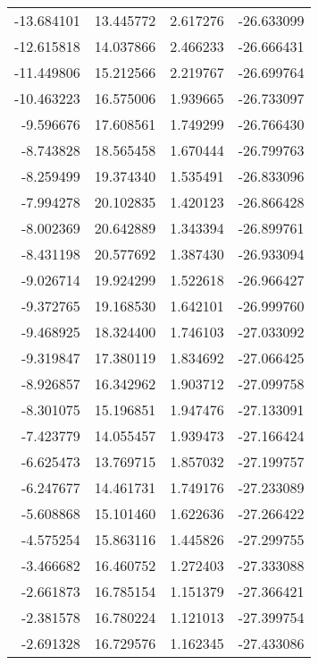 \begin{tabular}{rrrr}
      -13.684101 &        13.445772 &    2.617276 & -26.633099 \\
      -12.615818 &        14.037866 &    2.466233 & -26.666431 \\
      -11.449806 &        15.212566 &    2.219767 & -26.699764 \\
      -10.463223 &        16.575006 &    1.939665 & -26.733097 \\
       -9.596676 &        17.608561 &    1.749299 & -26.766430 \\
       -8.743828 &        18.565458 &    1.670444 & -26.799763 \\
       -8.259499 &        19.374340 &    1.535491 & -26.833096 \\
       -7.994278 &        20.102835 &    1.420123 & -26.866428 \\
       -8.002369 &        20.642889 &    1.343394 & -26.899761 \\
       -8.431198 &        20.577692 &    1.387430 & -26.933094 \\
       -9.026714 &        19.924299 &    1.522618 & -26.966427 \\
       -9.372765 &        19.168530 &    1.642101 & -26.999760 \\
       -9.468925 &        18.324400 &    1.746103 & -27.033092 \\
       -9.319847 &        17.380119 &    1.834692 & -27.066425 \\
       -8.926857 &        16.342962 &    1.903712 & -27.099758 \\
       -8.301075 &        15.196851 &    1.947476 & -27.133091 \\
       -7.423779 &        14.055457 &    1.939473 & -27.166424 \\
       -6.625473 &        13.769715 &    1.857032 & -27.199757 \\
       -6.247677 &        14.461731 &    1.749176 & -27.233089 \\
       -5.608868 &        15.101460 &    1.622636 & -27.266422 \\
       -4.575254 &        15.863116 &    1.445826 & -27.299755 \\
       -3.466682 &        16.460752 &    1.272403 & -27.333088 \\
       -2.661873 &        16.785154 &    1.151379 & -27.366421 \\
       -2.381578 &        16.780224 &    1.121013 & -27.399754 \\
       -2.691328 &        16.729576 &    1.162345 & -27.433086 \\

\end{tabular}
